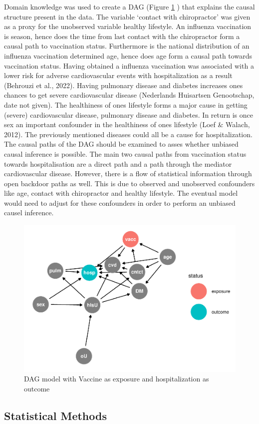 \documentclass[
]{article}
\begin{document}
Domain knowledge was used to create a DAG (Figure \ref{fig:dag} ) that explains the causal structure present in the data. The variable `contact with chiropractor' was given as a proxy for the unobserved variable healthy lifestyle. An influenza vaccination is season, hence does the time from last contact with the chiropractor form a causal path to vaccination status. Furthermore is the national distribution of an influenza vaccination determined age, hence does age form a causal path towards vaccination status. Having obtained a influenza vaccination was associated with a lower risk for adverse cardiovascular events with hospitalization as a result (Behrouzi et al., 2022). Having pulmonary disease and diabetes increases ones chances to get severe cardiovascular disease (Nederlands Huisartsen Genootschap, date not given). The healthiness of ones lifestyle forms a major cause in getting (severe) cardiovascular disease, pulmonary disease and diabetes. In return is once sex an important confounder in the healthiness of ones lifestyle (Loef \& Walach, 2012). The previously mentioned diseases could all be a cause for hospitalization.\\
The causal paths of the DAG should be examined to asses whether unbiased causal inference is possible. The main two causal paths from vaccination status towards hospitalisation are a direct path and a path through the mediator cardiovascular disease. However, there is a flow of statistical information through open backdoor paths as well. This is due to observed and unobserved confounders like age, contact with chiropractor and healthy lifestyle. The eventual model would need to adjust for these confounders in order to perform an unbiased causel inference.

\begin{figure}
\includegraphics[width=0.5\linewidth]{Assignment_files/figure-latex/dag-1} \caption{DAG model with Vaccine as exposure and hospitalization as outcome}\label{fig:dag}
\end{figure}

\hypertarget{statistical-methods}{%
\subsection{Statistical Methods}\label{statistical-methods}}
\end{document}
